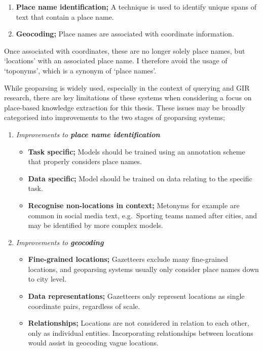 \documentclass[
  letterpaper,
  11pt,
  english,
  onehalfspacing,
  headsepline]{MastersDoctoralThesis}
\providecommand{\tightlist}{%
  \setlength{\itemsep}{0pt}\setlength{\parskip}{0pt}}\usepackage{longtable,booktabs,array}
\begin{document}
\begin{enumerate}
\def\labelenumi{\arabic{enumi}.}
\tightlist
\item
  \textbf{Place name identification;} A technique is used to identify
  unique spans of text that contain a place name.
\item
  \textbf{Geocoding;} Place names are associated with coordinate
  information.
\end{enumerate}

Once associated with coordinates, these are no longer solely place
names, but `locations' with an associated place name. I therefore avoid
the usage of `toponyms', which is a synonym of `place names'.

While geoparsing is widely used, especially in the context of querying
and GIR research, there are key limitations of these systems when
considering a focus on place-based knowledge extraction for this thesis.
These issues may be broadly categorised into improvements to the two
stages of geoparsing systems;

\begin{enumerate}
\def\labelenumi{\arabic{enumi}.}
\tightlist
\item
  \emph{Improvements to \textbf{place name identification}}

  \begin{itemize}
  \tightlist
  \item
    \textbf{Task specific;} Models should be trained using an annotation
    scheme that properly considers place names.
  \item
    \textbf{Data specific;} Model should be trained on data relating to
    the specific task.
  \item
    \textbf{Recognise non-locations in context;} Metonyms for example
    are common in social media text, e.g.~Sporting teams named after
    cities, and may be identified by more complex models.
  \end{itemize}
\item
  \emph{Improvements to \textbf{geocoding}}

  \begin{itemize}
  \tightlist
  \item
    \textbf{Fine-grained locations;} Gazetteers exclude many
    fine-grained locations, and geoparsing systems usually only consider
    place names down to city level.
  \item
    \textbf{Data representations;} Gazetteers only represent locations
    as single coordinate pairs, regardless of scale.
  \item
    \textbf{Relationships;} Locations are not considered in relation to
    each other, only as individual entities. Incorporating relationships
    between locations would assist in geocoding vague locations.
  \end{itemize}
\end{enumerate}
\end{document}
